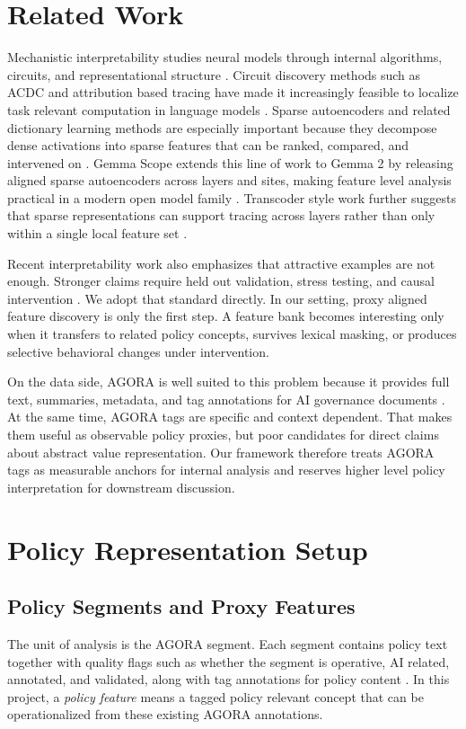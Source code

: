 ﻿\documentclass{article}
\begin{document}
\section{Related Work}
Mechanistic interpretability studies neural models through internal algorithms, circuits, and representational structure \citep{elhage2021framework}. Circuit discovery methods such as ACDC and attribution based tracing have made it increasingly feasible to localize task relevant computation in language models \citep{conmy2023towards, ameisen2025circuit}. Sparse autoencoders and related dictionary learning methods are especially important because they decompose dense activations into sparse features that can be ranked, compared, and intervened on \citep{bricken2023monosemanticity, cunningham2024sparse, marks2024sparse}. Gemma Scope extends this line of work to Gemma 2 by releasing aligned sparse autoencoders across layers and sites, making feature level analysis practical in a modern open model family \citep{lieberum2024gemma}. Transcoder style work further suggests that sparse representations can support tracing across layers rather than only within a single local feature set \citep{dunefsky2024transcoders}.

Recent interpretability work also emphasizes that attractive examples are not enough. Stronger claims require held out validation, stress testing, and causal intervention \citep{arditi2024refusal, ameisen2025circuit}. We adopt that standard directly. In our setting, proxy aligned feature discovery is only the first step. A feature bank becomes interesting only when it transfers to related policy concepts, survives lexical masking, or produces selective behavioral changes under intervention.

On the data side, AGORA is well suited to this problem because it provides full text, summaries, metadata, and tag annotations for AI governance documents \citep{agora2024}. At the same time, AGORA tags are specific and context dependent. That makes them useful as observable policy proxies, but poor candidates for direct claims about abstract value representation. Our framework therefore treats AGORA tags as measurable anchors for internal analysis and reserves higher level policy interpretation for downstream discussion.

\section{Policy Representation Setup}
\subsection{Policy Segments and Proxy Features}
The unit of analysis is the AGORA segment. Each segment contains policy text together with quality flags such as whether the segment is operative, AI related, annotated, and validated, along with tag annotations for policy content \citep{agora2024}. In this project, a \emph{policy feature} means a tagged policy relevant concept that can be operationalized from these existing AGORA annotations.
\end{document}
